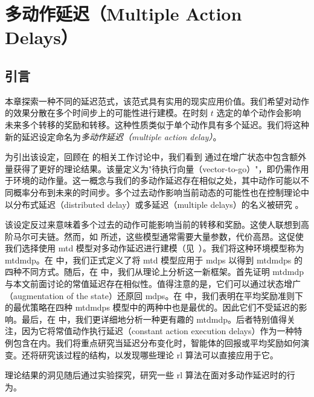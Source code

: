 \chapter{多动作延迟（Multiple Action Delays）}
\label{chap:multi_action_delay}


\section{引言}

本章探索一种不同的延迟范式，该范式具有实用的现实应用价值。我们希望对动作的效果分散在多个时间步上的可能性进行建模。在时刻 $t$ 选定的单个动作会影响未来多个转移的奖励和转移。这种性质类似于单个动作具有多个延迟。我们将这种新的延迟设定命名为\emph{多动作延迟（multiple action delay）}。

为引出该设定，回顾在  的相关工作讨论中，我们看到 \cite{xiao2020thinking} 通过在增广状态中包含额外量获得了更好的理论结果。该量定义为"待执行向量（vector-to-go）"，即仍需作用于环境的动作量。这一概念与我们的多动作延迟存在相似之处，其中动作可能以不同概率分布到未来的时间步。多个过去动作影响当前动态的可能性也在控制理论中以分布式延迟（distributed delay）或多延迟（multiple delays）的名义被研究 \cite{gu2003survey,richard2003time}。

该设定反过来意味着多个过去的动作可能影响当前的转移和奖励。这使人联想到高阶马尔可夫链。然而，如  所述，这些模型通常需要大量参数，代价高昂。这促使我们选择使用 \gls{mtd} 模型对多动作延迟进行建模（见~）。我们将这种环境模型称为 \gls{mtdmdp}。在  中，我们正式定义了将 \gls{mtd} 模型应用于 \glspl{mdp} 以得到 \glspl{mtdmdp} 的四种不同方式。随后，在  中，我们从理论上分析这一新框架。首先证明 \gls{mtdmdp} 与本文前面讨论的常值延迟存在相似性。值得注意的是，它们可以通过状态增广（augmentation of the state）还原回 \glspl{mdp}。在  中，我们表明在平均奖励准则下的最优策略在四种 \glspl{mtdmdp} 模型中的两种中也是最优的。因此它们不受延迟的影响。最后，在  中，我们更详细地分析一种更有趣的 \gls{mtdmdp}。后者特别值得关注，因为它将常值动作执行延迟（constant action execution delays）作为一种特例包含在内。我们将重点研究当延迟分布变化时，智能体的回报或平均奖励如何演变。还将研究该过程的结构，以发现哪些理论 \gls{rl} 算法可以直接应用于它。

理论结果的洞见随后通过实验探究，研究一些 \gls{rl} 算法在面对多动作延迟时的行为。





